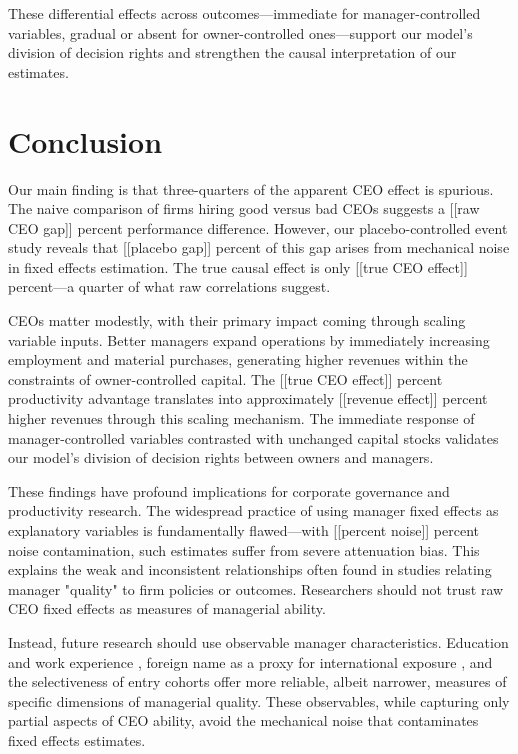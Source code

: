 \documentclass[11pt,a4paper]{article}
\begin{document}
These differential effects across outcomes—immediate for manager-controlled variables, gradual or absent for owner-controlled ones—support our model's division of decision rights and strengthen the causal interpretation of our estimates.

\section{Conclusion}

Our main finding is that three-quarters of the apparent CEO effect is spurious. The naive comparison of firms hiring good versus bad CEOs suggests a [[raw CEO gap]] percent performance difference. However, our placebo-controlled event study reveals that [[placebo gap]] percent of this gap arises from mechanical noise in fixed effects estimation. The true causal effect is only [[true CEO effect]] percent—a quarter of what raw correlations suggest.

CEOs matter modestly, with their primary impact coming through scaling variable inputs. Better managers expand operations by immediately increasing employment and material purchases, generating higher revenues within the constraints of owner-controlled capital. The [[true CEO effect]] percent productivity advantage translates into approximately [[revenue effect]] percent higher revenues through this scaling mechanism. The immediate response of manager-controlled variables contrasted with unchanged capital stocks validates our model's division of decision rights between owners and managers.

These findings have profound implications for corporate governance and productivity research. The widespread practice of using manager fixed effects as explanatory variables is fundamentally flawed—with [[percent noise]] percent noise contamination, such estimates suffer from severe attenuation bias. This explains the weak and inconsistent relationships often found in studies relating manager "quality" to firm policies or outcomes. Researchers should not trust raw CEO fixed effects as measures of managerial ability.

Instead, future research should use observable manager characteristics. Education and work experience \citep{DePirro2025}, foreign name as a proxy for international exposure \citep{Koren2023expat}, and the selectiveness of entry cohorts \citep{koren2024managers} offer more reliable, albeit narrower, measures of specific dimensions of managerial quality. These observables, while capturing only partial aspects of CEO ability, avoid the mechanical noise that contaminates fixed effects estimates.
\end{document}
